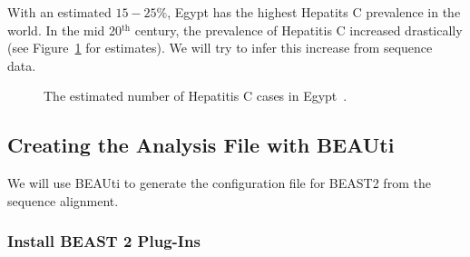\documentclass[11pt]{article}
\newcommand{\fixme}[1]{\textcolor{red}{\texttt{{\bf FIX ME:} #1}}}
\begin{document}
With an estimated $15-25\%$, Egypt has the highest Hepatits C prevalence in the world. In the mid 20$^{\mathrm{th}}$ century, the prevalence of Hepatitis C increased drastically (see Figure~\ref{fig:prevalence} for estimates). We will try to infer this increase from sequence data. 






\begin{figure}[h!]
\centering
{}
\caption{\small The estimated number of Hepatitis C cases in Egypt~\citep{Pybus2003}.}
\label{fig:prevalence}
\end{figure}




\bigskip
\subsection{Creating the Analysis File with BEAUti}

We will use BEAUti to generate the configuration file for BEAST2 from the sequence alignment.

\bigskip
\subsubsection{Install BEAST 2 Plug-Ins}
\end{document}
